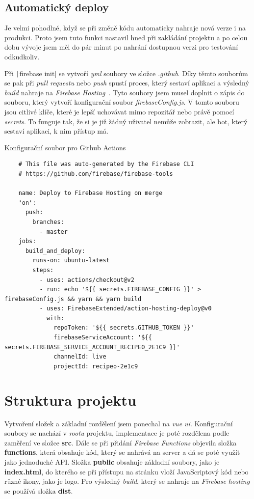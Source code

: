 \subsection{Automatický deploy}
Je velmi pohodlné, když se při změně kódu automaticky nahraje nová verze i na produkci. Proto jsem tuto funkci nastavil hned
při zakládání projektu a po celou dobu vývoje jsem měl do pár minut po nahrání dostupnou verzi pro testování odkudkoliv.

Při \texttt|firebase init| se vytvoří \emph{yml} soubory ve složce \emph{.github}. Díky těmto souborům se pak při
\emph{pull requestu} nebo \emph{push} spustí proces, který sestaví aplikaci a výsledný \emph{build} nahraje na \emph{Firebase Hosting}~\cite{FirebaseDeploy}.
Tyto soubory jsem musel doplnit o zápis do souboru, který vytvoří konfigurační soubor \emph{firebaseConfig.js}. V tomto souboru jsou citlivé klíče, které je lepší
uchovávat mimo repozitář nebo právě pomocí \emph{secrets}. To funguje tak, že si je již žádný uživatel nemůže zobrazit, ale bot, který sestaví aplikaci, k nim
přístup má.

\begin{listing}[h]
    \caption{Konfigurační soubor pro Github Actions}
    \begin{verbatim}
    # This file was auto-generated by the Firebase CLI
    # https://github.com/firebase/firebase-tools

    name: Deploy to Firebase Hosting on merge
    'on':
      push:
        branches:
          - master
    jobs:
      build_and_deploy:
        runs-on: ubuntu-latest
        steps:
          - uses: actions/checkout@v2
          - run: echo '${{ secrets.FIREBASE_CONFIG }}' > firebaseConfig.js && yarn && yarn build
          - uses: FirebaseExtended/action-hosting-deploy@v0
            with:
              repoToken: '${{ secrets.GITHUB_TOKEN }}'
              firebaseServiceAccount: '${{ secrets.FIREBASE_SERVICE_ACCOUNT_RECIPEO_2E1C9 }}'
              channelId: live
              projectId: recipeo-2e1c9
    \end{verbatim}
\end{listing}

\section{Struktura projektu}
Vytvoření složek a základní rozdělení jsem ponechal na \emph{vue ui}. Konfigurační soubory se nachází v \emph{rootu} projektu, implementace
je poté rozdělena podle zaměření ve složce \textbf{src}. Dále se při přidání \emph{Firebase Functions} objevila složka \textbf{functions}, která
obsahuje kód, který se nahrává na server a dá se poté využít jako jednoduché API. Složka \textbf{public} obsahuje základní soubory, jako je \textbf{index.html},
do kterého se při přístupu na stránku vloží JavaScriptový kód nebo různé ikony, jako je logo. Pro výsledný \emph{build}, který se nahraje na \emph{Firebase hosting} se
používá složka \textbf{dist}.

